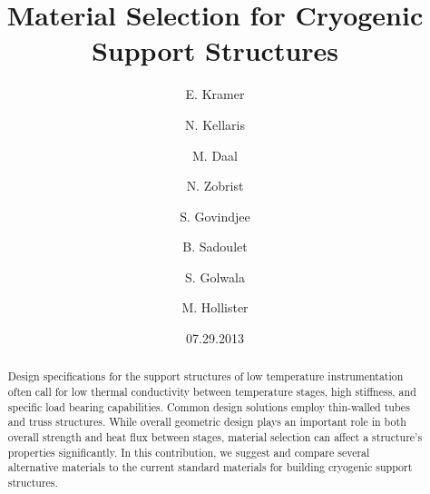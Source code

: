\documentclass[final]{svjour2}
\begin{document}
\newcommand{\hdblarrow}{H\makebox[0.9ex][l]{$\downdownarrows$}-}
\title{Material Selection for Cryogenic Support Structures}

\author{E. Kramer \and N. Kellaris  \and M. Daal \and N. Zobrist \and S. Govindjee \and B. Sadoulet \and S. Golwala \and M. Hollister}


\date{07.29.2013}

\maketitle

\begin{abstract}

Design specifications for the support structures of low temperature instrumentation often call for low thermal conductivity between temperature stages, high stiffness, and specific load bearing capabilities. Common design solutions employ thin-walled tubes and truss structures.  While overall geometric design plays an important role in both overall strength and heat flux between stages, material selection can affect a structure's properties significantly.  In this contribution, we suggest and compare several alternative materials to the current standard materials for building cryogenic support structures.

 
\end{abstract}
\end{document}
